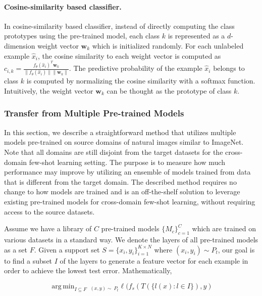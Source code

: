 \documentclass[runningheads]{llncs}
\DeclareMathOperator*{\argmin}{arg\,min}
\begin{document}
\paragraph{Cosine-similarity based classifier.} 
In cosine-similarity based classifier, instead of directly computing the class prototypes using the pre-trained model, each class $k$ is represented as a $d$-dimension weight vector $\mathbf{w}_k$ which is initialized randomly. For each unlabeled example $\hat{x}_i$, the cosine similarity to each weight vector is computed as $c_{i,k} = \frac{f_{\theta}(\hat{x}_i)^T \mathbf{w}_k}{\lVert f_{\theta}(\hat{x}_i) \rVert \lVert \mathbf{w}_k \rVert }$. The predictive probability of the example $\hat{x}_i$ belongs to class $k$ is computed by normalizing the cosine similarity with a softmax function. Intuitively, the weight vector $\mathbf{w}_k$ can be thought as the prototype of class $k$.


\subsubsection{Transfer from Multiple Pre-trained Models}
In this section, we describe a straightforward method that utilizes multiple models pre-trained on source domains of natural images similar to ImageNet. Note that all domains are still disjoint from the target datasets for the cross-domain few-shot learning setting. The purpose is to measure how much performance may improve by utilizing an ensemble of models trained from data that is different from the target domain. The described method requires no change to how models are trained and is an off-the-shelf solution to leverage existing pre-trained models for cross-domain few-shot learning, without requiring access to the source datasets.




Assume we have a library of $C$ pre-trained models $\{M_c\}_{c=1}^{C}$ which are trained on various datasets in a standard way. We denote the layers of all pre-trained models as a set $F$. Given a support set $S = \{x_i, y_i\}_{i=1}^{K \times N}$ where $(x_i, y_i) \sim P_t$, our goal is to find a subset $I$ of the layers to generate a feature vector for each example in order to achieve the lowest test error. Mathematically, 
 
\begin{equation}
\label{selection}
    \argmin_{I \subseteq F} \,_{(x, y) \sim\ P_t} \ell ( f_s(  T (\{l(x): l \in I \}), y)
\end{equation}
\end{document}
